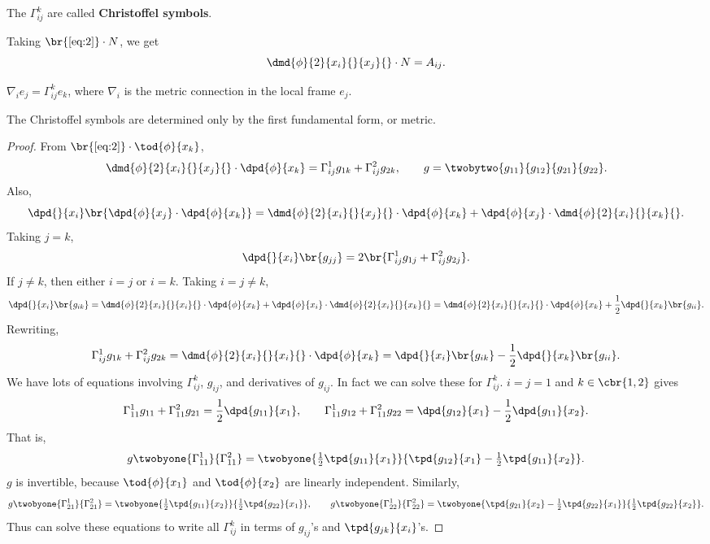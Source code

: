 \begin{definition}
The $ \Gamma_{ij}^k $ are called \textbf{Christoffel symbols}.
\end{definition}

Taking $ \br{\ref{eq:2}} \cdot N $, we get
$$ \dmd{\phi}{2}{x_i}{}{x_j}{} \cdot N = A_{ij}. $$

\begin{note*}
$ \nabla_ie_j = \Gamma_{ij}^ke_k $, where $ \nabla_i $ is the metric connection in the local frame $ e_j $.
\end{note*}

\begin{proposition}
The Christoffel symbols are determined only by the first fundamental form, or metric.
\end{proposition}

\begin{proof}
From $ \br{\ref{eq:2}} \cdot \tod{\phi}{x_k} $,
$$ \dmd{\phi}{2}{x_i}{}{x_j}{} \cdot \dpd{\phi}{x_k} = \Gamma_{ij}^1g_{1k} + \Gamma_{ij}^2g_{2k}, \qquad g = \twobytwo{g_{11}}{g_{12}}{g_{21}}{g_{22}}. $$
Also,
$$ \dpd{}{x_i}\br{\dpd{\phi}{x_j} \cdot \dpd{\phi}{x_k}} = \dmd{\phi}{2}{x_i}{}{x_j}{} \cdot \dpd{\phi}{x_k} + \dpd{\phi}{x_j} \cdot \dmd{\phi}{2}{x_i}{}{x_k}{}. $$
Taking $ j = k $,
$$ \dpd{}{x_i}\br{g_{jj}} = 2\br{\Gamma_{ij}^1g_{1j} + \Gamma_{ij}^2g_{2j}}. $$
If $ j \ne k $, then either $ i = j $ or $ i = k $. Taking $ i = j \ne k $,
$$ \dpd{}{x_i}\br{g_{ik}} = \dmd{\phi}{2}{x_i}{}{x_i}{} \cdot \dpd{\phi}{x_k} + \dpd{\phi}{x_i} \cdot \dmd{\phi}{2}{x_i}{}{x_k}{} = \dmd{\phi}{2}{x_i}{}{x_i}{} \cdot \dpd{\phi}{x_k} + \dfrac{1}{2}\dpd{}{x_k}\br{g_{ii}}. $$
Rewriting,
$$ \Gamma_{ij}^1g_{1k} + \Gamma_{ij}^2g_{2k} = \dmd{\phi}{2}{x_i}{}{x_i}{} \cdot \dpd{\phi}{x_k} = \dpd{}{x_i}\br{g_{ik}} - \dfrac{1}{2}\dpd{}{x_k}\br{g_{ii}}. $$
We have lots of equations involving $ \Gamma_{ij}^k $, $ g_{ij} $, and derivatives of $ g_{ij} $. In fact we can solve these for $ \Gamma_{ij}^k $. $ i = j = 1 $ and $ k \in \cbr{1, 2} $ gives
$$ \Gamma_{11}^1g_{11} + \Gamma_{11}^2g_{21} = \dfrac{1}{2}\dpd{g_{11}}{x_1}, \qquad \Gamma_{11}^1g_{12} + \Gamma_{11}^2g_{22} = \dpd{g_{12}}{x_1} - \dfrac{1}{2}\dpd{g_{11}}{x_2}. $$
That is,
$$ g\twobyone{\Gamma_{11}^1}{\Gamma_{11}^2} = \twobyone{\tfrac{1}{2}\tpd{g_{11}}{x_1}}{\tpd{g_{12}}{x_1} - \tfrac{1}{2}\tpd{g_{11}}{x_2}}. $$
$ g $ is invertible, because $ \tod{\phi}{x_1} $ and $ \tod{\phi}{x_2} $ are linearly independent. Similarly,
$$ g\twobyone{\Gamma_{21}^1}{\Gamma_{21}^2} = \twobyone{\tfrac{1}{2}\tpd{g_{11}}{x_2}}{\tfrac{1}{2}\tpd{g_{22}}{x_1}}, \qquad g\twobyone{\Gamma_{22}^1}{\Gamma_{22}^2} = \twobyone{\tpd{g_{21}}{x_2} - \tfrac{1}{2}\tpd{g_{22}}{x_1}}{\tfrac{1}{2}\tpd{g_{22}}{x_2}}. $$
Thus can solve these equations to write all $ \Gamma_{ij}^k $ in terms of $ g_{ij} $'s and $ \tpd{g_{jk}}{x_i} $'s.
\end{proof}

